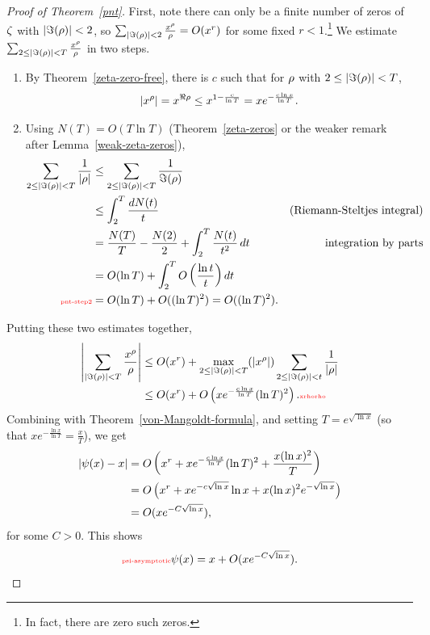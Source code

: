 \begin{proof}[Proof of Theorem~\ref{pnt}]
First, note there can only be a finite number of zeros of $\zeta$ with $|\Im(\rho)|<2$, so $\sum_{|\Im(\rho)|<2}\frac{x^{\rho}}{\rho}=O(x^r)$ for some fixed $r<1$.\footnote{In fact, there are zero such zeros.} We estimate $\sum_{2\le |\Im(\rho)|<T}\frac{x^{\rho}}{\rho}$ in two steps.
\begin{enumerate}
\item By Theorem~\ref{zeta-zero-free}, there is $c$ such that for $\rho$ with $2\le |\Im(\rho)|<T$,  
\[
|x^{\rho}|=x^{\Re\rho}\le x^{1-\frac{c}{\ln T}}=xe^{-\frac{c\ln x}{\ln T}}.
\]
\item Using $N(T)=O(T\ln T)$ (Theorem~\ref{zeta-zeros} or the weaker remark after Lemma~\ref{weak-zeta-zeros}),
\begin{align}
\nonumber
\sum_{2\le |\Im(\rh)|<T}\frac{1}{\ab{\rh}}
&\le \sum_{2\le |\Im(\rh)|<T}\frac{1}{\Im(\rh)}\\
\nonumber
&\le \int_2^{T} \frac{dN(t)}{t}&\text{(Riemann-Steltjes integral)}\\
\nonumber
&= \frac{N(T)}{T}-\fc{N(2)}2+\int_2^T \frac{N(t)}{t^2}\,dt
&\text{integration by parts}\\
\nonumber
&=O(\ln T)+\int_2^T O\pf{\ln t}{t}dt\\
\llabel{pnt-step2}
&=O(\ln T)+O((\ln T)^2)=O((\ln T)^2).
\end{align}
\end{enumerate}
Putting these two estimates together,
\begin{align}
\nonumber
\ab{\sum_{|\Im(\rh)|<T}\frac{x^{\rh}}{\rh}}
&\le O(x^r)+\max_{2\le |\Im(\rh)|<T}(|x^{\rh}|)\sum_{2\le |\Im(\rh)|<t}\frac{1}{|\rh|}\\
&\le O(x^r)+O\pa{xe^{-\frac{c\ln x}{\ln T}}(\ln T)^2}.\llabel{xrhorho}
\end{align}
Combining with Theorem~\ref{von-Mangoldt-formula}, and setting $T=e^{\sqrt{\ln x}}$ (so that 
$xe^{-\frac{\ln x}{\ln T}}
=\frac{x}{T}$), we get 
\begin{align*}
|\psi(x)-x|&
= O\pa{
x^r+xe^{-\frac{c\ln x}{\ln T}}(\ln T)^2+\frac{x(\ln x)^2}{T}
}\\
&=O\pa{x^r+xe^{-c\sqrt{\ln x}}\ln x+x(\ln x)^2 e^{-\sqrt{\ln x}}}\\ 
&=O(xe^{-C\sqrt{\ln x}}),%
\end{align*}
for some $C>0$. This shows 
\begin{equation}\llabel{psi-asymptotic}
\psi(x)=x+O(xe^{-C\sqrt{\ln x}}).

\end{equation}
\end{proof}

